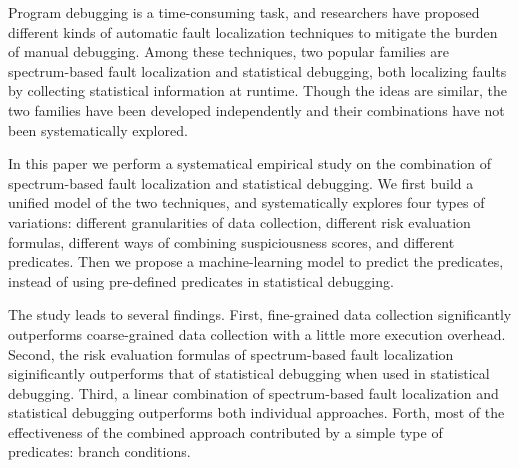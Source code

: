 \begin{eabstract}

Program debugging is a time-consuming task,
and researchers have proposed different kinds of automatic fault localization techniques
to mitigate the burden of manual debugging.
Among these techniques, two popular families are spectrum-based fault localization
and statistical debugging,
both localizing faults by collecting statistical information at runtime.
Though the ideas are similar, the two families have been developed independently
and their combinations have not been systematically explored.

In this paper we perform a systematical empirical study on the combination of spectrum-based
fault localization and statistical debugging.
We first build a unified model of the two techniques,
and systematically explores four types of variations:
different granularities of data collection,
different risk evaluation formulas, different ways of combining suspiciousness scores,
and different predicates.
Then we propose a machine-learning model to predict the predicates,
instead of using pre-defined predicates in statistical debugging.

The study leads to several findings.
First, fine-grained data collection significantly outperforms
coarse-grained data collection with a little more execution overhead.
Second, the risk evaluation formulas of spectrum-based fault localization
siginificantly outperforms that of statistical debugging when used in statistical debugging.
Third, a linear combination of spectrum-based fault localization and
statistical debugging outperforms both individual approaches.
Forth, most of the effectiveness of the combined approach contributed by a simple type of predicates:
branch conditions.

\end{eabstract}

